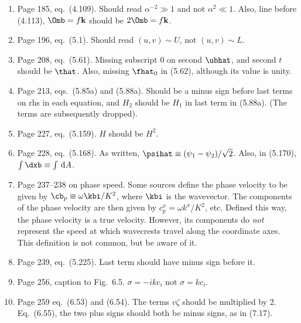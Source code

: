 \documentclass[10pt]{article}
\newcommand{\eq}{eq.\ } \newcommand{\Eq}{Eq.\ }
\begin{document}
\begin{enumerate}
\item Page 185, \eq (4.109). Should read $\alpha^{-2} \gg 1$ and not $\alpha^2 \ll 1$. Also, line before (4.113), $\Omb = f \kb$ should be $2\Omb = f \kb$.

\item Page 196, \eq (5.1). Should read $(u, v) \sim U$, not $(u,v) \sim L$.

\item Page 208, \eq (5.61). Missing subscript 0 on second $\ubhat$, and second $t$ should be $\that$. Also, missing $\fhat_0$ in (5.62), although its value is unity.

\item Page 213, eqs.\ (5.85a) and (5.88a). Should be a minus sign before last terms on rhs in each equation, and $H_2$ should be $H_1$ in last term in (5.88a). (The terms are subsequently dropped).

\item Page 227, \eq (5.159). $H$ should be $H^2$.

\item Page 228, \eq (5.168). As written, $\psihat \equiv (\psi_1 -\psi_2)/\sqrt 2$. Also, in (5.170), $\int \dxb \equiv \int \dA$.

\item Page 237--238 on phase speed. Some sources define the phase velocity to be given by $\cb_p \equiv \omega \kbi / K^2$, where $\kbi$ is the wavevector. The components of the phase velocity are then given by $c^x_p = \omega k^x/K^2$, etc. Defined this way, the phase velocity is a true velocity. However, its components do \emph{not} represent the speed at which wavecrests travel along the coordinate axes. This definition is not common, but be aware of it.

\item Page 239, \eq (5.225). Last term should have minus sign before it.


\item Page 256, caption to Fig.\ 6.5. $\sigma = -i k c_i$ not $\sigma = kc_i$.


\item Page 259 \eq (6.53) and (6.54). The terms $v \zeta$ should be multiplied by 2. \\ Eq.\ (6.55), the two plus signs should both be minus signs, as in (7.17).



\end{enumerate}
\end{document}
